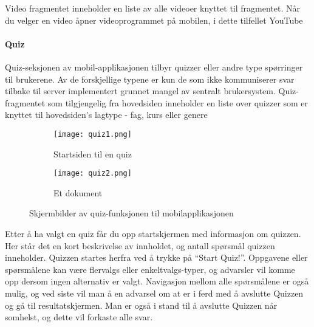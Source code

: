 \documentclass[../main.tex]{subfiles}
\begin{document}
Video fragmentet inneholder en liste av alle videoer knyttet til fragmentet. Når du velger en video åpner videoprogrammet på mobilen, i dette tilfellet YouTube

\paragraph{Quiz}

Quiz-seksjonen av mobil-applikasjonen tilbyr quizzer eller andre type spørringer til brukerene. Av de forskjellige typene er kun de som ikke kommuniserer svar tilbake til server implementert grunnet mangel av sentralt brukersystem.
Quiz-fragmentet som tilgjengelig fra hovedsiden inneholder en liste over quizzer som er knyttet til hovedsiden’s lagtype - fag, kurs eller genere

\begin{figure}[H]
        \centering
        \begin{subfigure}[b]{0.3\textwidth}
                \centering
                \texttt{[image: quiz1.png]}
                \caption{Startsiden til en quiz}
        \end{subfigure}
        \quad
        \begin{subfigure}[b]{0.3\textwidth}
                \centering
                \texttt{[image: quiz2.png]}
                \caption{Et dokument}
        \end{subfigure}
        \caption{Skjermbilder av quiz-funksjonen til mobilapplikasjonen}
\end{figure}

Etter å ha valgt en quiz får du opp startskjermen med informasjon om quizzen. Her står det en kort beskrivelse av innholdet, og antall spørsmål quizzen inneholder. Quizzen startes herfra ved å trykke på “Start Quiz!”.
Oppgavene eller spørsmålene kan være flervalgs eller enkeltvalgs-typer, og advarsler vil komme opp dersom ingen alternativ er valgt. Navigasjon mellom alle spørsmålene er også mulig, og ved siste vil man å en advarsel om at er i ferd med å avslutte Quizzen og gå til resultatskjermen. Man er også i stand til å avslutte Quizzen når somhelst, og dette vil forkaste alle svar.
\end{document}
